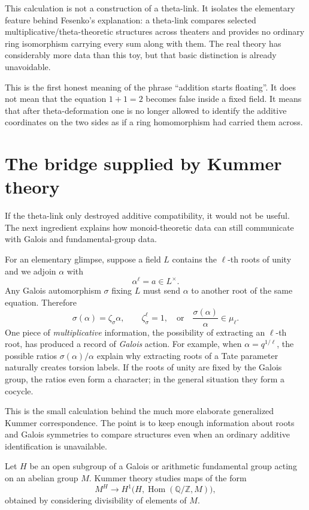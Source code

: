This calculation is not a construction of a theta-link. It isolates the elementary feature behind Fesenko's explanation: a theta-link compares selected multiplicative/theta-theoretic structures across theaters and provides no ordinary ring isomorphism carrying every sum along with them. The real theory has considerably more data than this toy, but that basic distinction is already unavoidable.

This is the first honest meaning of the phrase ``addition starts floating''.  It does not mean that the equation \(1+1=2\) becomes false inside a fixed field.  It means that after theta-deformation one is no longer allowed to identify the additive coordinates on the two sides as if a ring homomorphism had carried them across.

\section{The bridge supplied by Kummer theory}

If the theta-link only destroyed additive compatibility, it would not be useful.  The next ingredient explains how monoid-theoretic data can still communicate with Galois and fundamental-group data.

For an elementary glimpse, suppose a field $L$ contains the $\ell$-th roots of unity and we adjoin $\alpha$ with
\[
 \alpha^\ell=a\in L^\times.
\]
Any Galois automorphism $\sigma$ fixing $L$ must send $\alpha$ to another root of the same equation. Therefore
\[
 \sigma(\alpha)=\zeta_\sigma\alpha,
 \qquad \zeta_\sigma^\ell=1,
 \quad\text{or}\quad
 \boxed{\frac{\sigma(\alpha)}{\alpha}\in\mu_\ell.}
\]
One piece of \emph{multiplicative} information, the possibility of extracting an $\ell$-th root, has produced a record of \emph{Galois} action. For example, when $\alpha=q^{1/\ell}$, the possible ratios $\sigma(\alpha)/\alpha$ explain why extracting roots of a Tate parameter naturally creates torsion labels. If the roots of unity are fixed by the Galois group, the ratios even form a character; in the general situation they form a cocycle.

This is the small calculation behind the much more elaborate generalized Kummer correspondence. The point is to keep enough information about roots and Galois symmetries to compare structures even when an ordinary additive identification is unavailable.

\begin{definition}
Let \(H\) be an open subgroup of a Galois or arithmetic fundamental group acting on an abelian group \(M\).  Kummer theory studies maps of the form
\[
  M^H\longrightarrow H^1\bigl(H,\operatorname{Hom}(\mathbb Q/\mathbb Z,M)\bigr),
\]
obtained by considering divisibility of elements of \(M\).
\end{definition}

